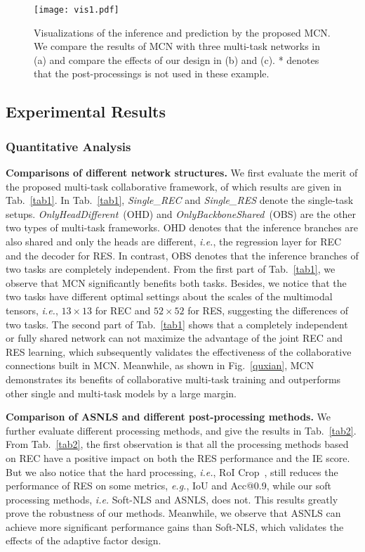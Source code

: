 \documentclass[10pt,twocolumn,letterpaper]{article}
\begin{document}
\begin{figure*}[t]
	\centering
	\texttt{[image: vis1.pdf]} \caption{Visualizations of the inference and prediction by the proposed MCN.  We compare the results of MCN with  three  multi-task networks in (a) and   compare the effects of our design in (b) and (c). * denotes that the post-processings is not used in these example.}
	\label{vis1}
\end{figure*}


\subsection{Experimental Results}
\subsubsection{Quantitative Analysis}
\textbf{Comparisons of different  network structures.
} 
We first evaluate the merit of the proposed multi-task collaborative framework, of which results are given in Tab.~\ref{tab1}.
In Tab.~\ref{tab1}, \emph{Single}\_\emph{REC} and \emph{Single\_RES} denote the single-task  setups.
\emph{OnlyHeadDifferent}~(OHD) and \emph{OnlyBackboneShared}~(OBS) are the other two types of multi-task frameworks. OHD denotes that the inference branches are also shared and only the heads are different, \emph{i.e.}, the regression layer for REC and the decoder for RES. 
In contrast, OBS denotes that the inference branches of two tasks are completely independent. 
From the first part of Tab.~\ref{tab1}, we observe that MCN  significantly benefits both  tasks.
Besides, we notice that the two tasks have different optimal settings about the scales of the multimodal tensors, \emph{i.e.}, $13 \times 13$ for REC and $52 \times 52$ for RES, suggesting the differences of two tasks. 
The second part of Tab.~\ref{tab1} shows that a completely independent or fully shared network can not maximize the advantage of the joint REC and RES learning, which subsequently validates the effectiveness of the collaborative connections built in MCN. Meanwhile,  as shown  in Fig.~\ref{quxian},  MCN demonstrates its benefits of collaborative multi-task training and  outperforms other single and multi-task models  by a large margin.  




\textbf{Comparison of ASNLS and different post-processing methods.} 
We further evaluate  different processing methods,  and give the results in Tab.~\ref{tab2}.
From Tab.~\ref{tab2}, the first observation is that all the processing methods based on REC have a positive impact on both the RES performance and the IE score.  
But we also notice that the hard processing, \emph{i.e.}, RoI Crop~\cite{he2017mask,ren2017faster},  still reduces the performance of RES on some metrics, \emph{e.g.}, IoU and Acc@0.9, while our soft processing methods, \emph{i.e.} Soft-NLS and ASNLS, does not. 
This results greatly prove the robustness of our methods.
Meanwhile, we  observe that ASNLS can achieve more significant performance gains than Soft-NLS, which validates the effects of the adaptive factor design. 
\end{document}
